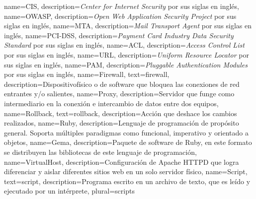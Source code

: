 {
  name={CIS},
  description={\textit{Center for Internet Security} por sus siglas en ingl\'{e}s},
}
{
  name={OWASP},
  description={\textit{Open Web Application Security Project} por sus siglas en ingl\'{e}s},
}
{
  name={MTA},
  description={\textit{Mail Transport Agent} por sus siglas en ingl\'{e}s},
}
{
  name={PCI-DSS},
  description={\textit{Payment Card Industry Data Security Standard} por sus siglas en ingl\'{e}s},
}
{
  name={ACL},
  description={\textit{Access Control List} por sus siglas en ingl\'{e}s},
}
{
  name={URL},
  description={\textit{Uniform Resource Locator} por sus siglas en ingl\'{e}s},
}
{
  name={PAM},
  description={\textit{Pluggable Authentication Modules} por sus siglas en ingl\'{e}s},
}
%
{
  name={Firewall},
  text={firewall},
  description={Dispositivof\'{i}sico o de \gls{software} que bloquea las conexiones de red entrantes y/o salientes},
}
{
  name={Proxy},
  description={Servidor que funge como intermediario en la conexi\'{o}n e intercambio de datos entre dos equipos},
}
{
  name={Rollback},
  text={rollback},
  description={Acci\'{o}n que deshace los cambios realizados},
}
{
  name={Ruby},
  description={Lenguaje de programaci\'{o}n de prop\'{o}sito general. Soporta m\'{u}ltiples paradigmas como funcional, imperativo y orientado a objetos},
}
{
  name={Gema},
  description={Paquete de \gls{software} de \Gls{Ruby}, en este formato se distribuyen las bibliotecas de este lenguaje de programaci\'{o}n},
}
{
  name={VirtualHost},
  description={Configuraci\'{o}n de Apache \textsc{HTTPD} que logra diferenciar y aislar diferentes sitios web en un solo servidor f\'{i}sico},
}
{
  name={Script},
  text={script},
  description={Programa escrito en un archivo de texto, que es le\'{i}do y ejecutado por un int\'{e}rprete},
  plural={scripts}
}
